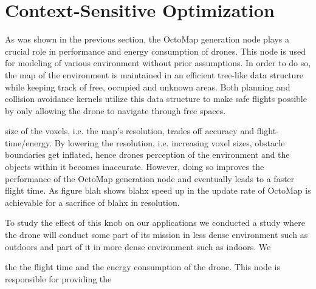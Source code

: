 \section{Context-Sensitive Optimization}
\label{sec:optimization}

As was shown in the previous section, the OctoMap generation node plays a crucial role in performance and energy consumption of drones.
This node is used for modeling of various environment without prior assumptions. In order to do so, the map of the environment is maintained in an efficient tree-like data structure while keeping track of free, occupied and unknown areas. Both planning and collision avoidance kernels utilize this data structure to make safe flights possible by only allowing the drone to navigate through free spaces.  

size of the voxels, i.e. the map's resolution, trades off accuracy and flight-time/energy. By lowering the resolution, i.e. increasing voxel sizes, obstacle boundaries get inflated, hence drones perception of the environment and the objects within it becomes inaccurate. However, doing so improves the performance of the OctoMap generation node and eventually leads to a faster flight time.  As figure blah shows blahx speed up in the update rate of OctoMap is achievable for a sacrifice of blahx in resolution. 

To study the effect of this knob on our applications we conducted a study where the drone will conduct some part of its mission in less dense environment such as outdoors and part of it in more dense environment such as indoors. We 



the  the flight time and the energy consumption of the drone. This node is responsible for providing the 